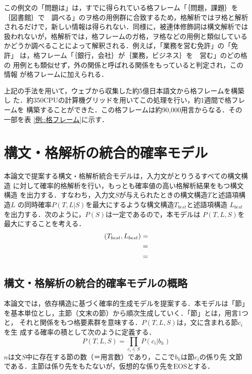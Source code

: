 \documentclass[japanese]{jnlp_1.3e}
\begin{document}
この例文の「問題は」は，すでに得られている格フレーム「｛問題，課題｝を 
｛図書館｝で　調べる」のヲ格の用例群に合致するため，格解析ではヲ格と解析
されるだけで，新しい情報は得られない．同様に，被連体修飾詞は構文解析では
扱われないが，格解析では，格フレームのガ格，ヲ格などの用例と類似している
かどうか調べることによって解釈される．例えば，「業務を営む免許」の「免許」
は，格フレーム「｛銀行，会社｝が｛業務，ビジネス｝を　営む」のどの格の
用例とも類似せず，外の関係と呼ばれる関係をもっていると判定され，この情報
が格フレームに加えられる．

上記の手法を用いて，ウェブから収集した約5億日本語文から格フレームを構築し
た．約350CPUの計算機グリッドを用いてこの処理を行い，約1週間で格フレームを
構築することができた．この格フレームは約90,000用言からなる．その一部を表
\ref{例::格フレーム}に示す．


\section{構文・格解析の統合的確率モデル}

本論文で提案する構文・格解析統合モデルは，入力文がとりうるすべての構文構造
に対して確率的格解析を行い，もっとも確率値の高い格解析結果をもつ構文構造
を出力する．すなわち，入力文$S$が与えられたときの構文構造$T$と述語項構造$L$ 
の同時確率$P(T,L|S)$を最大にするような構文構造$T_{best}$と述語項構造
$L_{best}$を出力する．次のように，$P(S)$は一定であるので，本モデルは
$P(T,L,S)$を最大にすることを考える．
\begin{align}
 (T_{best}, L_{best}) & = \argmax{(T, L)}{P(T,L|S)} \nonumber \\
                      & = \argmax{(T, L)}{\frac{P(T,L,S)}{P(S)}} \nonumber \\
                      & = \argmax{(T, L)}{P(T,L,S)}
\end{align}


\subsection{構文・格解析の統合的確率モデルの概略}

本論文では，依存構造に基づく確率的生成モデルを提案する．本モデルは「節」
を基本単位とし，主節（文末の節）から順次生成していく．「節」とは，用言1つと，
それと関係をもつ格要素群を意味する．$P(T,L,S)$は，文に含まれる節$c_i$を生
成する確率の積として次のように定義する．
\begin{equation} \label{Formula::Division}
 P(T,L,S)  = \prod_{c_i \in S} P(c_i|b_{h})
\end{equation}
$n$は文$S$中に存在する節の数（＝用言数）であり，ここで$b_{h}$は節$c_i$の係り先
文節である．主節は係り先をもたないが，仮想的な係り先を$\mbox{EOS}$とする．
\end{document}
